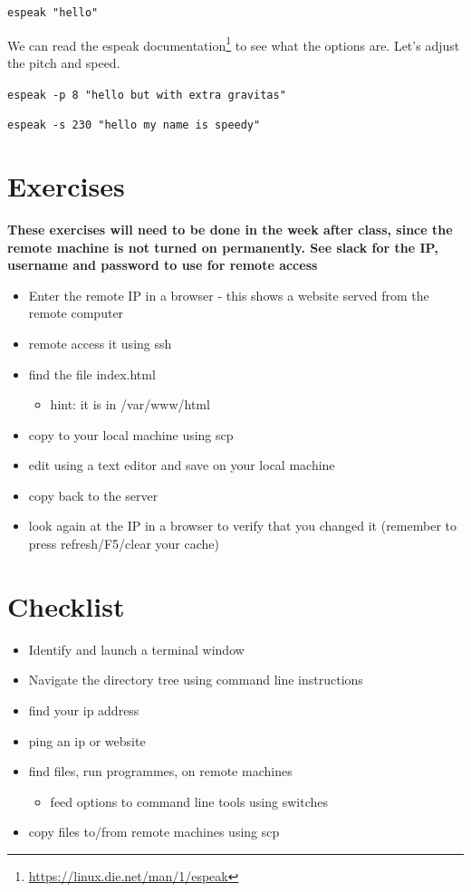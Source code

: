 \documentclass[
  12pt,
  a5paper,
]{book}
\DeclareRobustCommand{\href}[2]{#2\footnote{\url{#1}}}
\providecommand{\tightlist}{%
  \setlength{\itemsep}{0pt}\setlength{\parskip}{0pt}}
\begin{document}
\texttt{espeak\ "hello"}

We can read the \href{https://linux.die.net/man/1/espeak}{espeak documentation} to see what the options are. Let's adjust the pitch and speed.

\texttt{espeak\ -p\ 8\ "hello\ but\ with\ extra\ gravitas"}

\texttt{espeak\ -s\ 230\ "hello\ my\ name\ is\ speedy"}

\hypertarget{exercises-4}{%
\section{Exercises}\label{exercises-4}}

\textbf{These exercises will need to be done in the week after class, since the remote machine is not turned on permanently. See slack for the IP, username and password to use for remote access}

\begin{itemize}
\tightlist
\item
  Enter the remote IP in a browser - this shows a website served from the remote computer
\item
  remote access it using ssh
\item
  find the file index.html

  \begin{itemize}
  \tightlist
  \item
    hint: it is in /var/www/html
  \end{itemize}
\item
  copy to your local machine using scp
\item
  edit using a text editor and save on your local machine
\item
  copy back to the server
\item
  look again at the IP in a browser to verify that you changed it (remember to press refresh/F5/clear your cache)
\end{itemize}

\hypertarget{checklist-6}{%
\section{Checklist}\label{checklist-6}}

\begin{itemize}
\tightlist
\item
  Identify and launch a terminal window
\item
  Navigate the directory tree using command line instructions
\item
  find your ip address
\item
  ping an ip or website
\item
  find files, run programmes, on remote machines

  \begin{itemize}
  \tightlist
  \item
    feed options to command line tools using switches
  \end{itemize}
\item
  copy files to/from remote machines using scp
\end{itemize}
\end{document}
